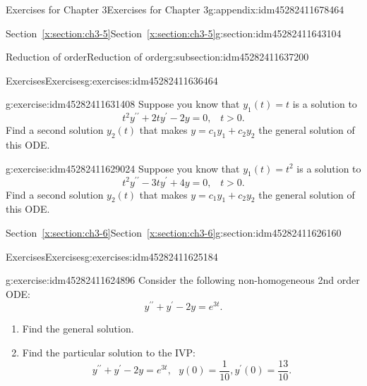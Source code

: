 \documentclass[oneside,10pt,]{book}
\numberwithin{equation}{section}
\numberwithin{equation}{section}
\begin{document}
\begin{appendixptx}{Exercises for Chapter 3}{}{Exercises for Chapter 3}{}{}{g:appendix:idm45282411678464}
\begin{sectionptx}{Section~\ref*{x:section:ch3-5}}{}{Section~\ref*{x:section:ch3-5}}{}{}{g:section:idm45282411643104}
\begin{subsectionptx}{Reduction of order}{}{Reduction of order}{}{}{g:subsection:idm45282411637200}
\begin{exercises-subsubsection-numberless}{Exercises}{}{Exercises}{}{}{g:exercises:idm45282411636464}
\begin{divisionexercise}{3}{}{}{g:exercise:idm45282411631408}
Suppose you know that \(y_{1}(t)=t\) is a solution to%
\begin{equation*}
t^{2}y^{\prime\prime}+2ty^{\prime}-2y=0,\,\,\,\,\,t>0.
\end{equation*}
Find a second solution \(y_{2}(t)\) that makes \(y=c_{1}y_{1}+c_{2}y_{2}\) the general solution of this ODE.\end{divisionexercise}%
\begin{divisionexercise}{4}{}{}{g:exercise:idm45282411629024}%
Suppose you know that \(y_{1}(t)=t^{2}\) is a solution to%
\begin{equation*}
t^{2}y^{\prime\prime}-3ty^{\prime}+4y=0,\,\,\,\,\,t>0.
\end{equation*}
Find a second solution \(y_{2}(t)\) that makes \(y=c_{1}y_{1}+c_{2}y_{2}\) the general solution of this ODE.\end{divisionexercise}%
\end{exercises-subsubsection-numberless}
\end{subsectionptx}
\end{sectionptx}
%
%
\typeout{************************************************}
\typeout{************************************************}
%
\begin{sectionptx}{Section~\ref*{x:section:ch3-6}}{}{Section~\ref*{x:section:ch3-6}}{}{}{g:section:idm45282411626160}
%
%
\typeout{************************************************}
\typeout{************************************************}
%
\begin{exercises-subsection-numberless}{Exercises}{}{Exercises}{}{}{g:exercises:idm45282411625184}
\begin{divisionexercise}{1}{}{}{g:exercise:idm45282411624896}%
Consider the following non-homogeneous 2nd order ODE:%
\begin{equation*}
y^{\prime\prime}+y^{\prime}-2y=e^{3t}.
\end{equation*}
%
\begin{enumerate}[label=(\alph*)]
\item{}Find the general solution.%
\item{}Find the particular solution to the IVP:%
\begin{equation*}
y^{\prime\prime}+y^{\prime}-2y=e^{3t},\,\,\,\,y(0)=\frac{1}{10},y^{\prime}(0)=\frac{13}{10}.
\end{equation*}
%
\end{enumerate}
\end{divisionexercise}%

\end{exercises-subsection-numberless}
\end{sectionptx}
\end{appendixptx}
\end{document}
